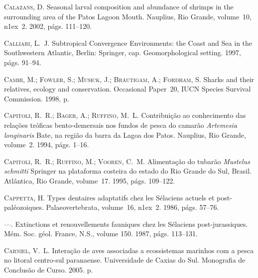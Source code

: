\documentclass[a4paper,11pt,twoside,showtrims,onecolumn,openright,final]{memoir}
\begin{document}
\begin{thebibliography}{194}
\textsc{Calazans, D.}
\newblock Seasonal larval composition and abundance of shrimps in the
  surrounding area of the {P}atos {L}agoon {M}outh.
\newblock Nauplius, Rio Grande, volume~10,
  n\raise1ex\hbox{}~2. 2002, p\'ags. 111--120.

\textsc{Calliari, L.~J.}
\newblock Subtropical {C}onvergence {E}nvironments: the {C}oast and {S}ea in
  the {S}outhwestern {A}tlantic, Berlin: Springer, cap. Geomorphological
  setting. 1997, p\'ags. 91--94.

\textsc{Camhi, M.; Fowler, S.; Musick, J.; Br\"autigam, A.; Fordham, S.}
\newblock Sharks and their relatives, ecology and conservation.
\newblock Occasional Paper~20, IUCN Species Survival Commission. 1998.
 p.

\textsc{Capitoli, R.~R.; Bager, A.; Ruffino, M.~L.}
\newblock Contribui\c{c}\~ao ao conhecimento das rela\c{c}\~oes tr\'oficas
  bento-demersais nos fundos de pesca do camar\~ao \emph{{A}rtemesia longinaris}
  {B}ate, na regi\~ao da barra da {L}agoa dos {P}atos.
\newblock Nauplius, Rio Grande, volume~2. 1994, p\'ags. 1--16.

\textsc{Capitoli, R.~R.; Ruffino, M.; Vooren, C.~M.}
\newblock Alimenta\c{c}\~ao do tubar\~ao \emph{{M}ustelus schmitti} {S}pringer na
  plataforma costeira do estado do {R}io {G}rande do {S}ul, {B}rasil.
\newblock Atl\^antica, Rio Grande, volume~17. 1995, p\'ags. 109--122.

\textsc{Cappetta, H.}
\newblock Types dentaires adaptatifs chez les {S}\'elaciens actuels et
  post-pal\'eozoiques.
\newblock Palaeovertebrata, volume~16, n\raise1ex\hbox{}~2. 1986, p\'ags. 57--76.

---.
\newblock Extinctions et renouvellements fauniques chez les {S}\'elaciens
  post-jurassiques.
\newblock M\'em. Soc. g\'eol. France, N.S., volume 150. 1987, p\'ags. 113--131.

\textsc{Carniel, V.~L.}
\newblock Intera\c{c}\~ao de aves associadas a ecossistemas marinhos com a
  pesca no litoral centro-sul paranaense.
\newblock Universidade de Caxias do Sul. Monografia de Conclus\~ao de Curso.
  2005.
 p.


\end{thebibliography}
\end{document}
